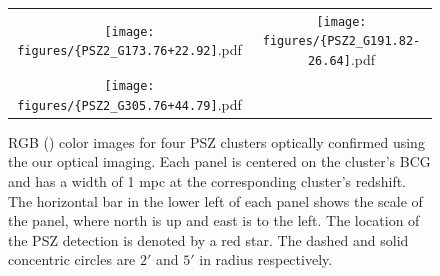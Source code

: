 \documentclass[apj, revtex4-1]{emulateapj}
\begin{document}
\begin{figure}
	\centering
	\begin{tabular}{cc}
		\texttt{[image: figures/\{PSZ2\_G173.76+22.92]}.pdf}&
		\texttt{[image: figures/\{PSZ2\_G191.82-26.64]}.pdf}\\
		\texttt{[image: figures/\{PSZ2\_G305.76+44.79]}.pdf}&
	\end{tabular}
	\caption{RGB (\sdssi\sdssr\sdssg) color images for four PSZ clusters optically confirmed using the our optical imaging. Each panel is centered on the cluster's BCG and has a width of 1 mpc at the corresponding cluster's redshift. The horizontal bar in the lower left of each panel shows the scale of the panel, where north is up and east is to the left. The location of the PSZ detection is denoted by a red star. The dashed and solid concentric circles are $2'$ and $5'$ in radius respectively.}
	\label{fig:Clusters4}
\end{figure}
\end{document}
